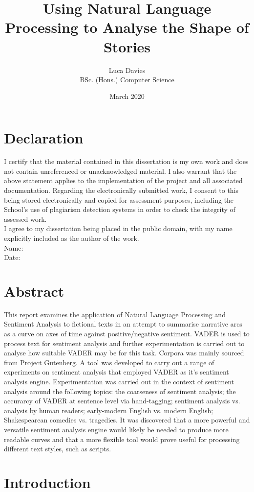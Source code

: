 \documentclass[a4paper]{article}
\title{\textbf{Using Natural Language Processing to Analyse the Shape of Stories}}
\author{
Luca Davies \\ BSc. (Hons.) Computer Science}
\date{March 2020}
\begin{document}
\maketitle
\newpage
\section*{Declaration}
    I certify that the material contained in this dissertation is my own work and does not contain unreferenced or unacknowledged material. I also warrant that the above statement applies to the implementation of the project and all associated documentation. Regarding the electronically submitted work, I consent to this being stored electronically and copied for assessment purposes, including the School’s use of plagiarism detection systems in order to check the integrity of assessed work. \\
    I agree to my dissertation being placed in the public domain, with my name explicitly included as the author of the work. \\
    
    \noindent
    Name: \\
    Date:
\newpage
\section*{Abstract}
    This report examines the application of Natural Language Processing and Sentiment Analysis to fictional texts in an attempt to summarise narrative arcs as a curve on axes of time against positive/negative sentiment. VADER is used to process text for sentiment analysis and further experimentation is carried out to analyse how suitable VADER may be for this task. Corpora was mainly sourced from Project Gutenberg. A tool was developed to carry out a range of experiments on sentiment analysis that employed VADER as it's sentiment analysis engine. Experimentation was carried out in the context of sentiment analysis around the following topics: the coarseness of sentiment analysis; the accurarcy of VADER at sentence level via hand-tagging; sentiment analysis vs. analysis by human readers; early-modern English vs. modern English; Shakespearean comedies vs. tragedies. It was discovered that a more powerful and versatile sentiment analysis engine would likely be needed to produce more readable curves and that a more flexible tool would prove useful for processing different text styles, such as scripts.
\newpage
\tableofcontents
\newpage
\section{Introduction}
\end{document}
